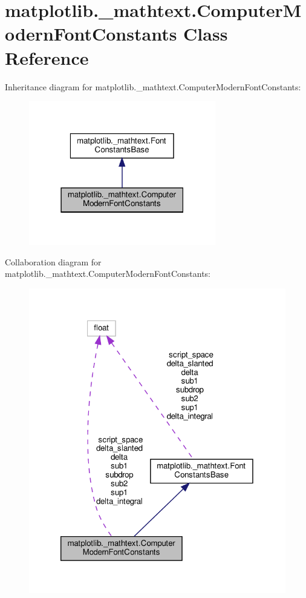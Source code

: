 \hypertarget{classmatplotlib_1_1__mathtext_1_1ComputerModernFontConstants}{}\section{matplotlib.\+\_\+mathtext.\+Computer\+Modern\+Font\+Constants Class Reference}
\label{classmatplotlib_1_1__mathtext_1_1ComputerModernFontConstants}


Inheritance diagram for matplotlib.\+\_\+mathtext.\+Computer\+Modern\+Font\+Constants\+:
\nopagebreak
\begin{figure}[H]
\begin{center}
\leavevmode
\includegraphics[width=231pt]{classmatplotlib_1_1__mathtext_1_1ComputerModernFontConstants__inherit__graph}
\end{center}
\end{figure}


Collaboration diagram for matplotlib.\+\_\+mathtext.\+Computer\+Modern\+Font\+Constants\+:
\nopagebreak
\begin{figure}[H]
\begin{center}
\leavevmode
\includegraphics[width=320pt]{classmatplotlib_1_1__mathtext_1_1ComputerModernFontConstants__coll__graph}
\end{center}
\end{figure}
